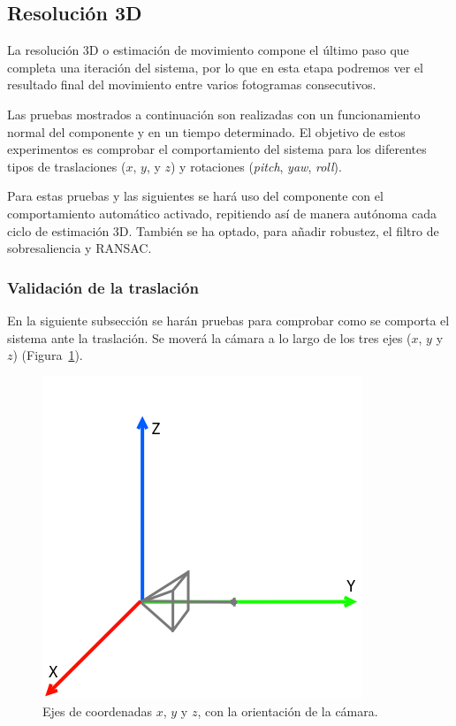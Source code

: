 \subsection{Resolución 3D}

La resolución 3D o estimación de movimiento compone el último paso que completa una iteración del sistema, por lo que en esta etapa podremos ver el resultado final del movimiento entre varios fotogramas consecutivos.

Las pruebas mostrados a continuación son realizadas con un funcionamiento normal del componente y en un tiempo determinado. El objetivo de estos experimentos es comprobar el comportamiento del sistema para los diferentes tipos de traslaciones ($x$, $y$, y $z$) y rotaciones (\textit{pitch}, \textit{yaw}, \textit{roll}).

Para estas pruebas y las siguientes se hará uso del componente con el comportamiento automático activado, repitiendo así de manera autónoma cada ciclo de estimación 3D. También se ha optado, para añadir robustez, el filtro de sobresaliencia y RANSAC.

\subsubsection{Validación de la traslación}

En la siguiente subsección se harán pruebas para comprobar como se comporta el sistema ante la traslación. Se moverá la cámara a lo largo de los tres ejes ($x$, $y$ y $z$) (Figura~\ref{fig:xyz}).

\begin{figure}[th]
\centering
\includegraphics[scale=0.3]{Figures/xyz.png}
\decoRule
\caption[Ejes de coordenadas $x$, $y$ y $z$]{Ejes de coordenadas $x$, $y$ y $z$, con la orientación de la cámara.}
\label{fig:xyz}
\end{figure}

